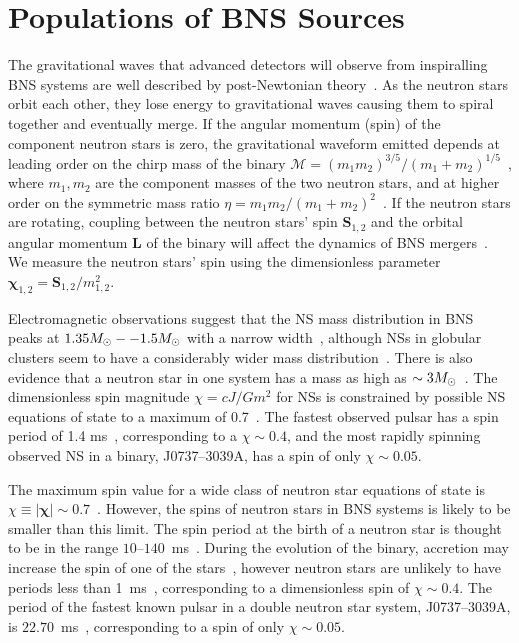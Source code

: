 \section{Populations of BNS Sources}


The gravitational waves that advanced detectors will observe from inspiralling BNS systems
are well described by post-Newtonian theory~\cite{Blanchet:2006zz}.
As the neutron stars orbit each other, they lose energy to gravitational waves
causing them to spiral together and eventually merge.
If the
angular momentum (spin) of the component neutron stars is zero, the gravitational
waveform emitted depends at leading order on the chirp mass of the binary
$\mathcal{M} = \left(m_1 m_2\right)^{3/5}/\left( m_1 +
m_2\right)^{1/5}$~\cite{Peters:1963ux}, where $m_1,m_2$ are the component masses
of the two neutron stars, and at higher order on the symmetric
mass ratio $\eta = m_1 m_2 /
(m_1+m_2)^2$~\cite{Blanchet:1995fg,Blanchet:1995ez,BIWW96,Wi93,BFIJ02,Blanchet:2004ek}.
If the neutron stars are rotating, 
coupling between the neutron stars' spin $\bm{S}_{1,2}$ and the
orbital angular momentum $\bm{L}$ of the binary will affect the dynamics of BNS
mergers~\cite{Kidder:1992fr,Apostolatos:1994mx,Kidder:1995zr,Blanchet:2006gy}.  
We measure the neutron stars' spin using the dimensionless parameter
$\bm{\chi}_{1,2} = {\bm{S}_{1,2}}/{m_{1,2}^2}$.


Electromagnetic observations suggest that the \ac{NS} mass
distribution in \ac{BNS} peaks at $1.35 M_\odot--1.5 M_\odot$ with a narrow
width~\cite{Kiziltan:2010ct}, although \acp{NS} in globular clusters seem to
have a considerably wider mass distribution~\cite{Kiziltan:2010ct}.  There is
also evidence that a neutron star in one system has a mass as high as $\sim 3
M_\odot$~\cite{Freire:2007jd}.  The dimensionless spin magnitude $\chi = cJ/Gm^2$ for
\acp{NS} is constrained by possible \ac{NS} equations of state to a maximum of
0.7~\cite{Lo:2010bj}.  The fastest observed pulsar has a spin period
of 1.4 ms~\cite{Hessels:2006ze}, corresponding to a $\chi \sim 0.4$, and the
most rapidly spinning observed \ac{NS} in a binary, J0737--3039A, has a spin
of only $\chi \sim 0.05$.

The maximum spin value for a wide class of neutron star equations of state is
$\chi \equiv \left| \bm{\chi} \right| \sim 0.7$~\cite{Lo:2010bj}. However, the spins of neutron stars in BNS
systems is likely to be smaller than this limit. The spin period at the birth
of a neutron star is thought to be in the range
$10$--$140$~ms~\cite{Lorimer:2008se,Mandel:2009nx}. During the evolution of
the binary, accretion may increase the spin of one of the
stars~\cite{Bildsten:1997vw}, however neutron stars are unlikely to have
periods less than 1~ms~\cite{Chakrabarty:2008gz}, corresponding to a
dimensionless spin of $\chi \sim 0.4$.  The period of the fastest known pulsar
in a double neutron star system, J0737--3039A, is
$22.70$~ms~\cite{Burgay:2003jj}, corresponding to a spin of only $\chi \sim
0.05$.

